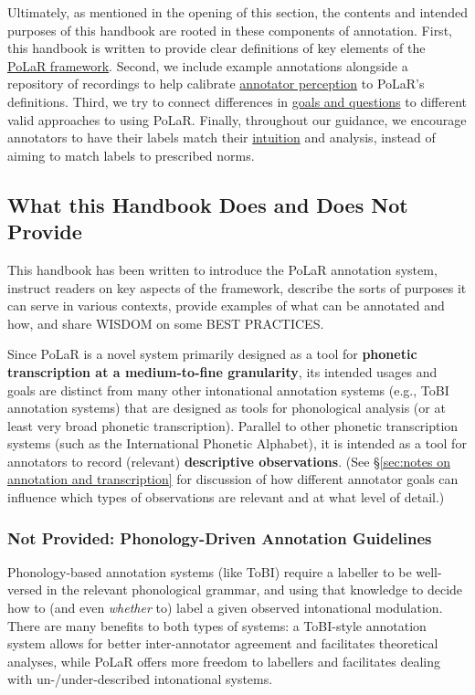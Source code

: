 \documentclass[11pt, twoside]{memoir}
\begin{document}
Ultimately, as mentioned in the opening of this section, the contents and intended purposes of this handbook are rooted in these components of annotation. First, this handbook is written to provide clear definitions of key elements of the \uline{PoLaR framework}. Second, we include example annotations alongside a repository of recordings to help calibrate \uline{annotator perception} to PoLaR's definitions. Third, we try to connect differences in \uline{goals and questions} to different valid approaches to using PoLaR. Finally, throughout our guidance, we encourage annotators to have their labels match their \uline{intuition} and analysis, instead of aiming to match labels to prescribed norms.

\subsection{What this Handbook Does and Does Not Provide}

This handbook has been written to introduce the PoLaR annotation system, instruct readers on key aspects of the framework, describe the sorts of purposes it can serve in various contexts, provide examples of what can be annotated and how, and share WISDOM on some BEST PRACTICES. 

Since PoLaR is a novel system primarily designed as a tool for \textbf{phonetic transcription at a medium-to-fine granularity}, its intended usages and goals are distinct from many other intonational annotation systems (e.g., ToBI annotation systems) that are designed as tools for phonological analysis (or at least very broad phonetic transcription). Parallel to other phonetic transcription systems (such as the International Phonetic Alphabet), it is intended as a tool for annotators to record (relevant) \textbf{descriptive observations}. (See §\ref{sec:notes on annotation and transcription} for discussion of how different annotator goals can influence which types of observations are relevant and at what level of detail.) 

\subsubsection{Not Provided: Phonology-Driven Annotation Guidelines}

Phonology-based annotation systems (like ToBI) require a labeller to be well-versed in the relevant phonological grammar, and using that knowledge to decide how to (and even \textit{whether} to) label a given observed intonational modulation. There are many benefits to both types of systems: a ToBI-style annotation system allows for better inter-annotator agreement and facilitates theoretical analyses, while PoLaR offers more freedom to labellers and facilitates dealing with un-/under-described intonational systems.
\end{document}
